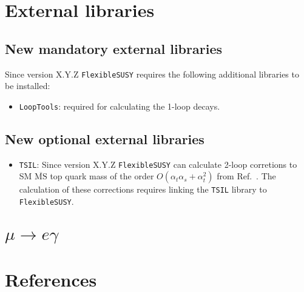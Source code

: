 \documentclass[final,3p,11pt,pdflatex]{elsarticle}
\makeatletter
\newcommand{\fs}{\texttt{FlexibleSUSY}\@\xspace}
\newcommand{\TSIL}{\texttt{TSIL}\@\xspace}
\newcommand{\LoopTools}{\texttt{LoopTools}\@\xspace}
\newcommand{\ol}[1]{\overline{#1}}
\newcommand{\MSbar}{\ensuremath{\ol{\text{MS}}}\xspace}
\def\at{\alpha_t}
\def\as{\alpha_s}
\makeatother
\begin{document}
\clearpage
\tableofcontents

\clearpage
\section{External libraries}

\subsection{New mandatory external libraries}

Since version X.Y.Z \fs requires the following additional libraries to
be installed:
%
\begin{itemize}
\item \LoopTools: required for calculating the 1-loop decays.
\end{itemize}

\subsection{New optional external libraries}

\begin{itemize}
\item \TSIL: Since version X.Y.Z \fs can calculate 2-loop corretions
  to SM \MSbar top quark mass of the order $O(\at\as + \at^2)$ from
  Ref.~\cite{Martin:2016xsp}.  The calculation of these corrections
  requires linking the \TSIL library \cite{Martin:2005qm} to \fs.
\end{itemize}

\clearpage
\section{$\mu\to e\gamma$}

\section*{References}



\end{document}
